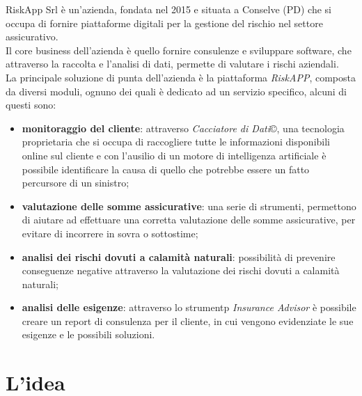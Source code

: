 RiskApp Srl è un'azienda, fondata nel 2015 e situata a Conselve (PD) che si occupa di fornire piattaforme digitali per la gestione del rischio nel settore assicurativo.\\
\indent Il core business dell'azienda è quello fornire consulenze e sviluppare software, che attraverso la raccolta e l'analisi di dati, permette di valutare i rischi aziendali. \\
\indent La principale soluzione di punta dell'azienda è la piattaforma \emph{RiskAPP}, composta da diversi moduli, ognuno dei quali è dedicato ad un servizio specifico, alcuni di questi sono:
\begin{itemize}
    \item \textbf{monitoraggio del cliente}: attraverso \emph{Cacciatore di Dati}\copyright, una tecnologia proprietaria che si occupa di raccogliere tutte le informazioni disponibili online sul cliente e con l'ausilio di un motore di intelligenza artificiale è possibile identificare la causa di quello che potrebbe essere un fatto percursore di un sinistro;
    \item \textbf{valutazione delle somme assicurative}: una serie di strumenti, permettono di aiutare ad effettuare una corretta valutazione delle somme assicurative, per evitare di incorrere in sovra o sottostime;
    \item \textbf{analisi dei rischi dovuti a calamità naturali}: possibilità di prevenire conseguenze negative attraverso la valutazione dei rischi dovuti a calamità naturali;
    \item \textbf{analisi delle esigenze}: attraverso lo strumentp \emph{Insurance Advisor} è possibile creare un report di consulenza per il cliente, in cui vengono evidenziate le sue esigenze e le possibili soluzioni.
\end{itemize}

\section{L'idea}
\label{sec:idea}

